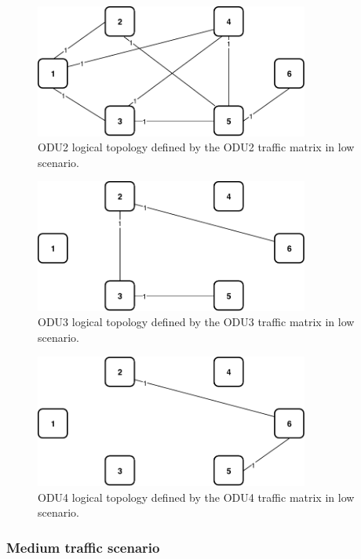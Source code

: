 \begin{figure}[h!]
\centering
\includegraphics[width=9cm]{sdf/ilp/opaque_survivability/figures/logical_topology_ODU2_low}
\caption{ODU2 logical topology defined by the ODU2 traffic matrix in low scenario.}
\label{logical_ODU2_low}
\end{figure}

\begin{figure}[h!]
\centering
\includegraphics[width=9cm]{sdf/ilp/opaque_survivability/figures/logical_topology_ODU3_low}
\caption{ODU3 logical topology defined by the ODU3 traffic matrix in low scenario.}
\label{logical_ODU3_low}
\end{figure}

\begin{figure}[h!]
\centering
\includegraphics[width=9cm]{sdf/ilp/opaque_survivability/figures/logical_topology_ODU4_low}
\caption{ODU4 logical topology defined by the ODU4 traffic matrix in low scenario.}
\label{logical_ODU4_low}
\end{figure}

\subsubsection{Medium traffic scenario}\label{medium_traffic_scenario}


